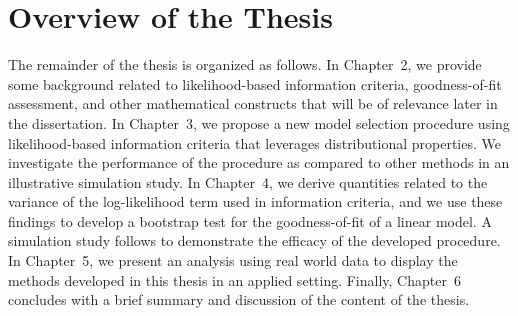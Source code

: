 		\section{Overview of the Thesis}
		The remainder of the thesis is organized as follows. In Chapter~2, we provide some background related to likelihood-based information criteria, goodness-of-fit assessment, and other mathematical
		constructs that will be of relevance later in the dissertation. In Chapter~3, we propose a new model selection procedure using likelihood-based information criteria that leverages distributional
		properties. We investigate the performance of the procedure as compared to other methods in an illustrative simulation study.  In Chapter~4, we derive quantities related to the variance of the
		log-likelihood term used in information criteria, and we use these findings to develop a bootstrap test for the goodness-of-fit of a linear model. A simulation study follows to demonstrate the
		efficacy of the developed procedure. In Chapter~5, we present an analysis using real world data to display the methods developed in this thesis in an applied setting.
		Finally, Chapter~6 concludes with a brief summary and discussion of the content of the thesis. 
		